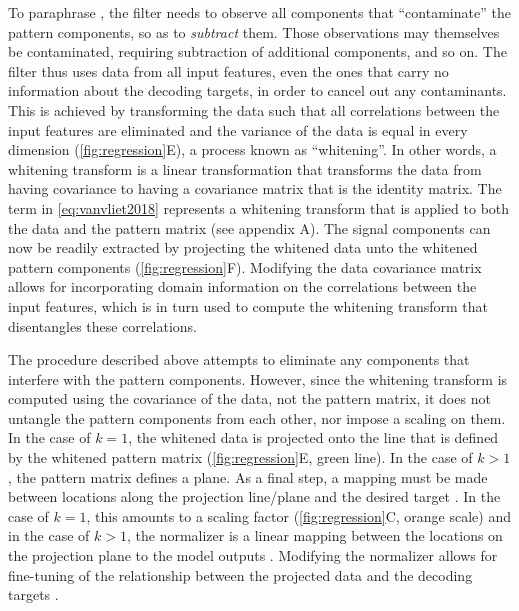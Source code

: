 \documentclass[a4paper]{vanvliet_paper}
\begin{document}
To paraphrase \textcite{DeCheveigne2008}, the filter needs to observe all components that ``contaminate'' the pattern components, so as to \textit{subtract} them.
Those observations may themselves be contaminated, requiring subtraction of additional components, and so on.
The filter thus uses data from all input features, even the ones that carry no information about the decoding targets, in order to cancel out any contaminants.
This is achieved by transforming the data such that all correlations between the input features are eliminated and the variance of the data is equal in every dimension (\autoref{fig:regression}E), a process known as ``whitening''.
In other words, a whitening transform is a linear transformation that transforms the data from having covariance  to having a covariance matrix that is the identity matrix.
The  term in \autoref{eq:vanvliet2018} represents a whitening transform that is applied to both the data and the pattern matrix (see appendix A).
The signal components can now be readily extracted by projecting the whitened data unto the whitened pattern components (\autoref{fig:regression}F).
Modifying the data covariance matrix  allows for incorporating domain information on the correlations between the input features, which is in turn used to compute the whitening transform that disentangles these correlations.

The procedure described above attempts to eliminate any components that interfere with the pattern components.
However, since the whitening transform is computed using the covariance of the data, not the pattern matrix, it does not untangle the pattern components from each other, nor impose a scaling on them.
In the case of $k=1$, the whitened data is projected onto the line that is defined by the whitened pattern matrix (\autoref{fig:regression}E, green line).
In the case of $k>1$, the pattern matrix defines a plane.
As a final step, a mapping must be made between locations along the projection line/plane and the desired target .
In the case of $k=1$, this amounts to a scaling factor (\autoref{fig:regression}C, orange scale) and in the case of $k > 1$, the normalizer is a linear mapping between the locations on the projection plane to the model outputs .
Modifying the normalizer  allows for fine-tuning of the relationship between the projected data and the decoding targets .
\end{document}
